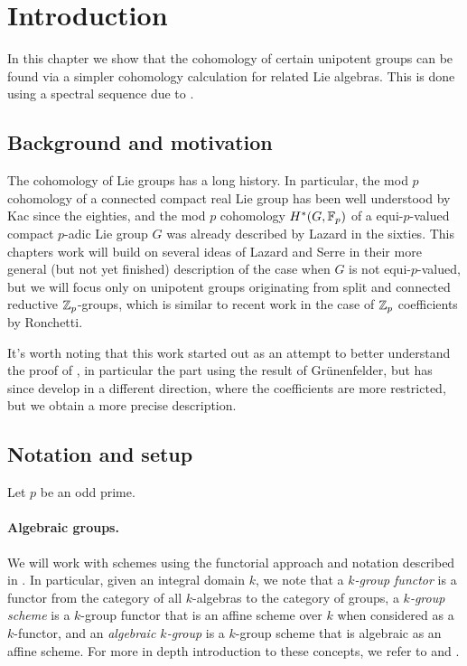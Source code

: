 \section{Introduction}%
\label{sec:cohunigps-intro}

In this chapter we show that the cohomology of certain unipotent groups can be found via a simpler cohomology calculation for related Lie algebras. This is done using a spectral sequence due to \cite{Sor}.

\subsection{Background and motivation}

The cohomology of Lie groups has a long history. In particular, the mod $p$ cohomology of a connected compact real Lie group has been well understood by Kac since the eighties, and the mod $p$ cohomology $H^*(G,\mathbb{F}_p)$ of a equi-$p$-valued compact $p$-adic Lie group $G$ was already described by Lazard in the sixties. This chapters work will build on several ideas of Lazard and Serre in their more general (but not yet finished) description of the case when $G$ is not equi-$p$-valued, but we will focus only on unipotent groups originating from split and connected reductive $\mathbb{Z}_p$-groups, which is similar to recent work in the case of $\mathbb{Z}_p$ coefficients by Ronchetti.

It's worth noting that this work started out as an attempt to better understand the proof of \cite[Theorem~7.1]{GK}, in particular the part using the result of Grünenfelder, but has since develop in a different direction, where the coefficients are more restricted, but we obtain a more precise description. 

\subsection{Notation and setup}

Let $p$ be an odd prime.

\paragraph{Algebraic groups.} We will work with schemes using the functorial approach and notation described in \cite{Jan}. In particular, given an integral domain $k$, we note that a \emph{$k$-group functor} is a functor from the category of all $k$-algebras to the category of groups, a \emph{$k$-group scheme} is a $k$-group functor that is an affine scheme over $k$ when considered as a $k$-functor, and an \emph{algebraic $k$-group} is a $k$-group scheme that is algebraic as an affine scheme. For more in depth introduction to these concepts, we refer to \cite{Con-book} and \cite{Jan}.

